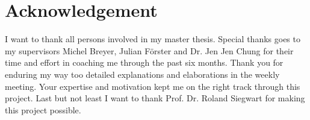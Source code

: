 \chapter*{Acknowledgement}

I want to thank all persons involved in my master thesis. Special thanks goes to my supervisors 	
Michel Breyer, Julian Förster and  Dr. Jen Jen Chung for their time and effort in coaching me through the past six months. Thank you for enduring my way too detailed explanations and elaborations in the weekly meeting. Your expertise and motivation kept me on the right track through this project. Last but not least I want to thank Prof. Dr. Roland Siegwart for making this project possible. 